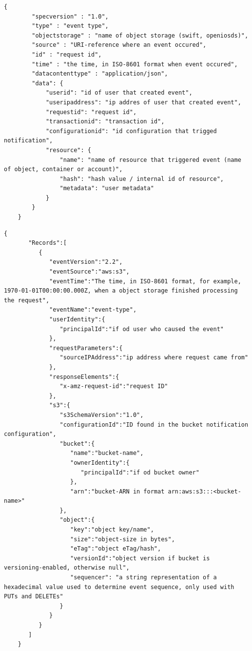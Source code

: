     \begin{lstlisting}[style=jsonStyle, caption=CloudEvents structure of event notification published by EventNotification middleware., label=lst:eventStructureCE]
    {
        "specversion" : "1.0",
        "type" : "event type",
        "objectstorage" : "name of object storage (swift, openiosds)",
        "source" : "URI-reference where an event occured",
        "id" : "request id",
        "time" : "the time, in ISO-8601 format when event occured",
        "datacontenttype" : "application/json",
        "data": {
            "userid": "id of user that created event",
            "useripaddress": "ip addres of user that created event",
            "requestid": "request id",
            "transactionid": "transaction id",
            "configurationid": "id configuration that trigged notification",
            "resource": {
                "name": "name of resource that triggered event (name of object, container or account)",
                "hash": "hash value / internal id of resource",
                "metadata": "user metadata"
            }
        }
    }
    \end{lstlisting}

    \begin{lstlisting}[style=jsonStyle, caption=Amazon S3 structure of event notification published by EventNotification middleware., label=lst:eventStructureS3]
    {
       "Records":[
          {
             "eventVersion":"2.2",
             "eventSource":"aws:s3",
             "eventTime":"The time, in ISO-8601 format, for example, 1970-01-01T00:00:00.000Z, when a object storage finished processing the request",
             "eventName":"event-type",
             "userIdentity":{
                "principalId":"if od user who caused the event"
             },
             "requestParameters":{
                "sourceIPAddress":"ip address where request came from"
             },
             "responseElements":{
                "x-amz-request-id":"request ID"
             },
             "s3":{
                "s3SchemaVersion":"1.0",
                "configurationId":"ID found in the bucket notification configuration",
                "bucket":{
                   "name":"bucket-name",
                   "ownerIdentity":{
                      "principalId":"if od bucket owner"
                   },
                   "arn":"bucket-ARN in format arn:aws:s3:::<bucket-name>"
                },
                "object":{
                   "key":"object key/name",
                   "size":"object-size in bytes",
                   "eTag":"object eTag/hash",
                   "versionId":"object version if bucket is versioning-enabled, otherwise null",
                   "sequencer": "a string representation of a hexadecimal value used to determine event sequence, only used with PUTs and DELETEs"
                }
             }
          }
       ]
    }
    \end{lstlisting}

